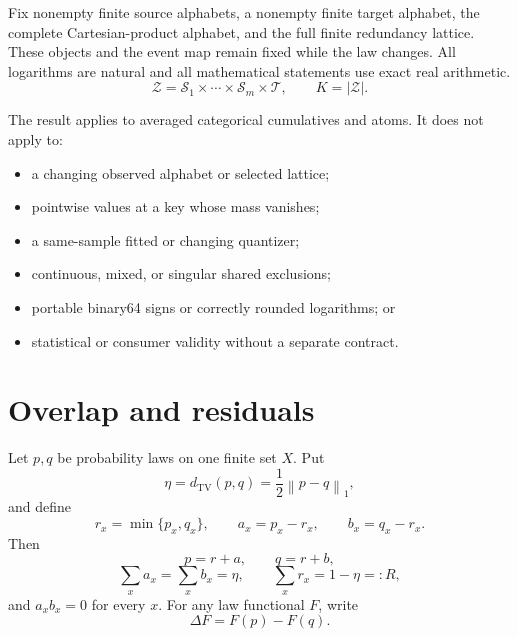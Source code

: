 \documentclass[11pt]{article}
\theoremstyle{definition}
\newcommand{\cZ}{\mathcal{Z}}
\newcommand{\cS}{\mathcal{S}}
\newcommand{\TV}{d_{\mathrm{TV}}}
\newcommand{\normone}[1]{\left\lVert #1\right\rVert_1}
\begin{document}
Fix nonempty finite source alphabets, a nonempty finite target alphabet, the complete
Cartesian-product alphabet, and the full finite redundancy lattice.  These objects and the event map remain fixed while the
law changes.  All logarithms are natural and all mathematical statements use exact real
arithmetic.
\begin{equation}
  \cZ
  =
  \cS_1\times\cdots\times\cS_m\times\mathcal T,
  \qquad
  K=|\cZ|.
\end{equation}

The result applies to averaged categorical cumulatives and atoms.  It does not apply to:
\begin{itemize}[leftmargin=2em]
  \item a changing observed alphabet or selected lattice;
  \item pointwise values at a key whose mass vanishes;
  \item a same-sample fitted or changing quantizer;
  \item continuous, mixed, or singular shared exclusions;
  \item portable binary64 signs or correctly rounded logarithms; or
  \item statistical or consumer validity without a separate contract.
\end{itemize}

\section{Overlap and residuals}

Let \(p,q\) be probability laws on one finite set \(X\).  Put
\begin{equation}
  \eta=\TV(p,q)=\frac12\normone{p-q},
\end{equation}
and define
\begin{equation}
  r_x=\min\{p_x,q_x\},
  \qquad
  a_x=p_x-r_x,
  \qquad
  b_x=q_x-r_x.
\end{equation}
Then
\begin{equation}
  p=r+a,\qquad q=r+b,
\end{equation}
\begin{equation}\label{eq:mass-identities}
  \sum_xa_x=\sum_xb_x=\eta,
  \qquad
  \sum_xr_x=1-\eta=:R,
\end{equation}
and \(a_xb_x=0\) for every \(x\).
For any law functional \(F\), write
\begin{equation}
  \Delta F=F(p)-F(q).
\end{equation}
\end{document}
